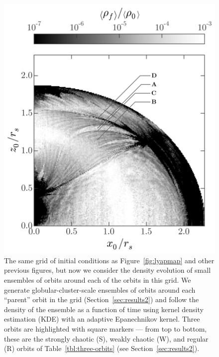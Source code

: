 \documentclass[letterpaper,12pt,preprint]{aastex}
\begin{document}
\clearpage
\begin{figure}[p]
\begin{center}
\includegraphics[width=\textwidth, trim={0 1cm 0 0}]{figures/ensemble-map.png}
\caption{The same grid of initial conditions as Figure~\ref{fig:lyapmap} and other previous figures, but now we consider the density evolution of small ensembles of orbits around each of the orbits in this grid. We generate globular-cluster-scale ensembles of orbits around each ``parent'' orbit in the grid (Section~\ref{sec:results2}) and follow the density of the ensemble as a function of time using kernel density estimation (KDE) with an adaptive Epanechnikov kernel. Three orbits are highlighted with square markers --- from top to bottom, these are the strongly chaotic (S), weakly chaotic (W), and regular (R) orbits of Table~\ref{tbl:three-orbits} (see Section~\ref{sec:results2}).} 
\label{fig:ensemblemap-meandensity}
\end{center}
\end{figure}
\end{document}

